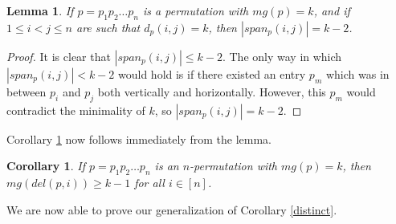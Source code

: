 \documentclass[11pt]{article}
\theoremstyle{plain}
\newtheorem{cor}[thm]{Corollary}
\newtheorem{lem}[thm]{Lemma}
\theoremstyle{definition}
\begin{document}
  \begin{lem} \label{span}
  If $p=p_1p_2 \ldots p_n$ is a permutation with $mg(p) = k$, and if $1\leq i
  < j \leq n$ are such that $d_p(i,j) = k$, then $|span_p(i,j)| = k-2$.
  \end{lem}
  \begin{proof}
  It is clear that $|span_p(i,j)| \leq k-2$. The only way in which $|span_p(i,j)|
  < k-2$ would hold is if there existed an entry $p_m$ which was in between $p_i$
  and $p_j$ both vertically and horizontally. However, this $p_m$ would contradict
  the minimality of $k$, so $|span_p(i,j)| = k-2$.  
  \end{proof}

  Corollary \ref{ratchet} now follows immediately from the lemma.

  \begin{cor} \label{ratchet} 
  If $p=p_1p_2 \ldots p_n$ is an $n$-permutation with $mg(p) =k$, then
  $mg(del(p,i)) \geq k-1$ for all $i \in [n]$.
  \end{cor}


  We are now able to prove our generalization of Corollary \ref{distinct}.
\end{document}
